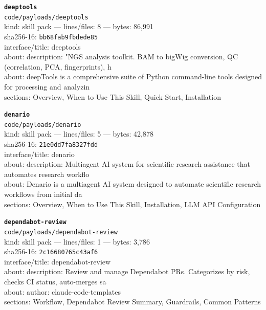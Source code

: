 \noindent\textbf{\texttt{deeptools}}\\
\texttt{code/payloads/deeptools}\\
kind: skill pack --- lines/files: 8 --- bytes: 86,991\\
sha256-16: \texttt{bb68fab9fbdede85}\\
interface/title: deeptools\\
about: description: "NGS analysis toolkit. BAM to bigWig conversion, QC (correlation, PCA, fingerprints), h\\
about: deepTools is a comprehensive suite of Python command-line tools designed for processing and analyzin\\
sections: Overview, When to Use This Skill, Quick Start, Installation\\
\vspace*{6.0pt}
\newpage

\noindent\textbf{\texttt{denario}}\\
\texttt{code/payloads/denario}\\
kind: skill pack --- lines/files: 5 --- bytes: 42,878\\
sha256-16: \texttt{21e0dd7fa8327fdd}\\
interface/title: denario\\
about: description: Multiagent AI system for scientific research assistance that automates research workflo\\
about: Denario is a multiagent AI system designed to automate scientific research workflows from initial da\\
sections: Overview, When to Use This Skill, Installation, LLM API Configuration\\
\vspace*{6.0pt}

\noindent\textbf{\texttt{dependabot-review}}\\
\texttt{code/payloads/dependabot-review}\\
kind: skill pack --- lines/files: 1 --- bytes: 3,786\\
sha256-16: \texttt{2c16680765c43af6}\\
interface/title: dependabot-review\\
about: description: Review and manage Dependabot PRs. Categorizes by risk, checks CI status, auto-merges sa\\
about: author: claude-code-templates\\
sections: Workflow, Dependabot Review Summary, Guardrails, Common Patterns\\
\vspace*{6.0pt}

